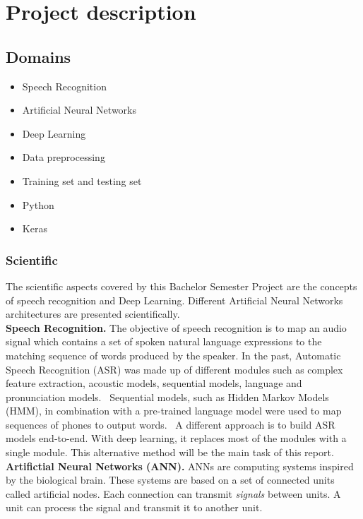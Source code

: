 
\section{Project description}
\subsection{Domains}

\begin{itemize}
        \item Speech Recognition
        \item Artificial Neural Networks
        \item Deep Learning 
        \item Data preprocessing
        \item Training set and testing set
        \item Python
        \item Keras
\end{itemize}

\subsubsection{Scientific}

The scientific aspects covered by this Bachelor Semester Project are the
concepts of speech recognition and Deep Learning. Different Artificial Neural
Networks architectures are presented scientifically. \\

\textbf{Speech Recognition.} The objective of speech recognition is to map an
audio signal which contains a set of spoken natural language expressions to the
matching sequence of words produced by the speaker. In the past, Automatic
Speech Recognition (ASR) was made up of different modules such as complex
feature extraction, acoustic models, sequential models, language and
pronunciation models.~\cite{DBLP:journals/corr/AmodeiABCCCCCCD15} Sequential
models, such as Hidden Markov Models (HMM), in combination with a pre-trained
language model were used to map sequences of phones to output
words.~\cite{Williamsong} A different approach is to build ASR models
end-to-end. With deep learning, it replaces most of the modules with a single
module. This alternative method will be the main task of this report.\\

\textbf{Artifictial Neural Networks (ANN).} ANNs are computing systems inspired
by the biological brain. These systems are based on a set of connected units
called artificial nodes. Each connection can transmit \textit{signals} between
units. A unit can process the signal and transmit it to another unit.\\

